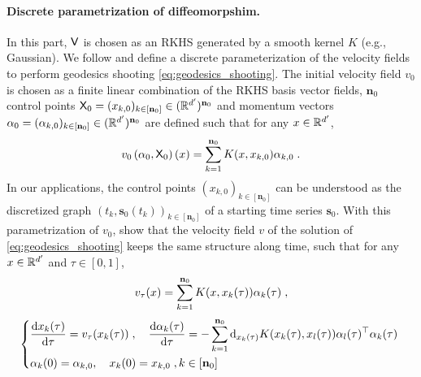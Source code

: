 \paragraph{Discrete parametrization of diffeomorpshim.}
In this part, $\mathsf{V}$ is chosen as an RKHS \cite{berlinet2011reproducing} generated by a smooth kernel $K$ (e.g., Gaussian). %
We follow \cite{durrleman2013sparse} and define a 
 discrete parameterization of the velocity fields to perform geodesics shooting \eqref{eq:geodesics_shooting}.  
  The initial velocity field $v_0$ is chosen as a finite linear combination of the RKHS basis vector fields, 
$\mathbf{n}_0$ control points $\mathsf{X}_0=(x_{k,0})_{k\in[\mathbf{n}_0]}\in (\mathbb{R}^{d'})^{\mathbf{n}_0}$ and momentum vectors $\alpha_0=(\alpha_{k,0})_{k\in[\mathbf{n}_0]}\in (\mathbb{R}^{d'})^{\mathbf{n}_0} $ are defined such that for any $x\in \mathbb{R}^{d'}$, 
  \begin{equation}
    \label{eq:def_v0}
    v_0\left(\alpha_0,\mathsf{X}_0\right)(x)=\sum_{k=1}^{\mathbf{n}_0} K(x,x_{k,0})\alpha_{k,0} \; .
  \end{equation}
   In our applications, the control points $(x_{k,0})_{k\in[\mathbf{n}_0]}$ can be understood as the discretized graph $(t_k,\mathbf{s}_0(t_k))_{k\in[\mathbf{n}_0]}$ of a starting time series $\mathbf{s}_0$. 
  With this parametrization of $v_0$, \citet{miller2006geodesic} show that the velocity field $v$ of the solution of \eqref{eq:geodesics_shooting} keeps the same
  structure along time, such that for any $x\in\mathbb{R}^{d'}$ and $\tau\in[0,1]$, 
  \begin{equation}
    \label{eq:specific_form}
    v_\tau(x)=\sum_{k=1}^{\mathbf{n}_0} K(x,x_k(\tau))\alpha_{k}(\tau) \; ,
  \end{equation}
  \begin{equation} 
    \label{eq:integration}
      \left\{
        \begin{aligned}
        & \frac{\mathop{}\!\mathrm{d} x_k(\tau)}{\mathop{}\!\mathrm{d} \tau}=v_\tau(x_k(\tau)) \;, \quad
        \frac{\mathop{}\!\mathrm{d} \alpha_k(\tau)}{\mathop{}\!\mathrm{d} \tau}=-\sum_{k=1}^{\mathbf{n}_0} \mathop{}\!\mathrm{d}_{x_k(\tau)} K(x_k(\tau),x_l(\tau))\alpha_{l}(\tau)^\top \alpha_{k}(\tau) \;  \\
        & \alpha_k(0)=\alpha_{k,0},\quad x_k(0)=x_{k,0} \; , k\in[\mathbf{n}_0] 
        \end{aligned}
        \right .
  \end{equation}
